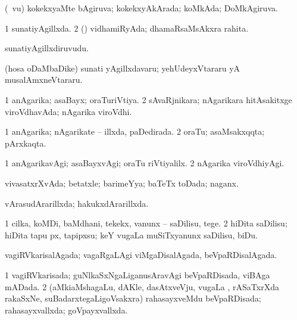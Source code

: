 {\bentry
{} 
\gl{\gu}
\expl{}
\bmng
{} 
\emng
\eentry

\bentry
{} 
\gl{\gu}
\expl{}
\bmng
(\aMrashA\ \mo vu) kokekxyaMte bAgiruva; kokekxyAkArada; koMkAda; DoMkAgiruva. 
\emng
\eentry

\bentry
{} 
\gl{\gu}
\bmng
\bnum
\num{1} sunatiyAgillxda. 
\num{2} (\rUpa) vidhamiRyAda; dhamaRsaMsAkxra rahita. 
\enum
\emng
\eentry

\bentry
     \gl{\nA} \bmng
sunatiyAgillxdiruvudu. 
\emng

\noindent
\gl{\pagu}
\expl{}
\bmng
{} (hosa oDaMbaDike) sunati yAgillxdavaru; yehUdeyxVtararu yA musalAmxneVtararu. 
\emng
\eentry

\bentry
{} 
\gl{\gu}
\expl{}
\bmng
\bnum
\num{1} anAgarika; asaBayx; oraTuriVtiya. 
\num{2} sAvaRjnikara; nAgarikara hitAsakitxge viroVdhavAda; nAgarika viroVdhi. 
\enum
\emng
\eentry

\bentry
{} 
\gl{\gu}
\expl{}
\bmng
\bnum
\num{1} anAgarika; nAgarikate -- illxda, paDedirada. 
\num{2} oraTu; asaMsakxqqta; pArxkaqta. 
\enum
\emng
\eentry

\bentry
{} 
\gl{\kirxvi}
\expl{}
\bmng
\bnum
\num{1} anAgarikavAgi; asaBayxvAgi; oraTu riVtiyalilx. 
\num{2} nAgarika viroVdhiyAgi. 
\enum
\emng
\eentry

\bentry
{} 
\gl{\gu}
\expl{}
\bmng
vivasatxrXvAda; betatxle; barimeYya; baTeTx toDada; naganx. 
\emng
\eentry

\bentry
{} 
\gl{\gu}
\expl{}
\bmng
vArasudArarillxda; hakukxdArarillxda. 
\emng
\eentry

\bentry
{} 
\gl{\sakirx}
\expl{}
\bmng
\bnum
\num{1} cilka, koMDi, baMdhani, tekekx, \mo vanunx -- saDilisu, tege. 
\num{2} hiDita saDilisu; hiDita tapu px, tapipxsu; keY \mo vugaLa muSiTxyanunx saDilisu, biDu. 
\enum
\emng
\eentry

\bentry
{} 
\gl{\gu}
\expl{}
\bmng
vagiRVkarisalAgada; vagaRgaLAgi viMgaDisalAgada, beVpaRDisalAgada. 
\emng
\eentry

\bentry
{} 
\gl{\gu}
\expl{}
\bmng
\bnum
\num{1} vagiRVkarisada; guNlkaSxNgaLiganusAravAgi beVpaRDisada, viBAga mADada. 
\num{2} (aMkiaMshagaLu, dAKle, dasAtxveVju, \mo vugaLa \vi, rASaTxrXda rakaSxNe, suBadarxtegaLigoVsakxra) rahasayxveMdu beVpaRDisada; rahasayxvallxda; goVpayxvallxda. 
\enum
\emng
\eentry

}
